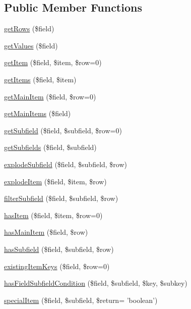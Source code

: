 \subsection*{Public Member Functions}
\begin{DoxyCompactItemize}
\item 
\hyperlink{classIsisConnector_a0d1ebc176fe54568044aae02d7932c9b}{getRows} (\$field)
\item 
\hyperlink{classIsisConnector_ad806dcc5be703fe9aea63d72d68af0a2}{getValues} (\$field)
\item 
\hyperlink{classIsisConnector_aa16bb24a54837048eee6244957cbf091}{getItem} (\$field, \$item, \$row=0)
\item 
\hyperlink{classIsisConnector_aa928456a26e0264bf0c1a4869a02cbb3}{getItems} (\$field, \$item)
\item 
\hyperlink{classIsisConnector_a21c7c4e9fec2440f8c7d36f8a632c8c2}{getMainItem} (\$field, \$row=0)
\item 
\hyperlink{classIsisConnector_a2bace7162ec3bf49df9f7acd9367c360}{getMainItems} (\$field)
\item 
\hyperlink{classIsisConnector_a1ddaff24266ee02d652de9a752c1be8e}{getSubfield} (\$field, \$subfield, \$row=0)
\item 
\hyperlink{classIsisConnector_ad8af0f5cef3b139649d9fb317264df10}{getSubfields} (\$field, \$subfield)
\item 
\hyperlink{classIsisConnector_afc97554b42b8b9e98f396811bbfa13d8}{explodeSubfield} (\$field, \$subfield, \$row)
\item 
\hyperlink{classIsisConnector_acfea4d86a683cc7455d258cdb80db478}{explodeItem} (\$field, \$item, \$row)
\item 
\hyperlink{classIsisConnector_a8baad24b6abc2ef29d8968f353ea6dae}{filterSubfield} (\$field, \$subfield, \$row)
\item 
\hyperlink{classIsisConnector_ad88ed9012aac0687aef1c8554879cd52}{hasItem} (\$field, \$item, \$row=0)
\item 
\hyperlink{classIsisConnector_a7bc914f2aa6c523404f368dc0b7b130b}{hasMainItem} (\$field, \$row)
\item 
\hyperlink{classIsisConnector_a2e6970a3aca76a1dbb5b4bb5ac3adda1}{hasSubfield} (\$field, \$subfield, \$row)
\item 
\hyperlink{classIsisConnector_a10669b49c4145a86dc3662c77733d74d}{existingItemKeys} (\$field, \$row=0)
\item 
\hyperlink{classIsisConnector_afbcef48a723b073a2777d5a5ed73d280}{hasFieldSubfieldCondition} (\$field, \$subfield, \$key, \$subkey)
\item 
\hyperlink{classIsisConnector_a9050227e8d8f10821a4df08a5705832a}{specialItem} (\$field, \$subfield, \$return= 'boolean')
\end{DoxyCompactItemize}


